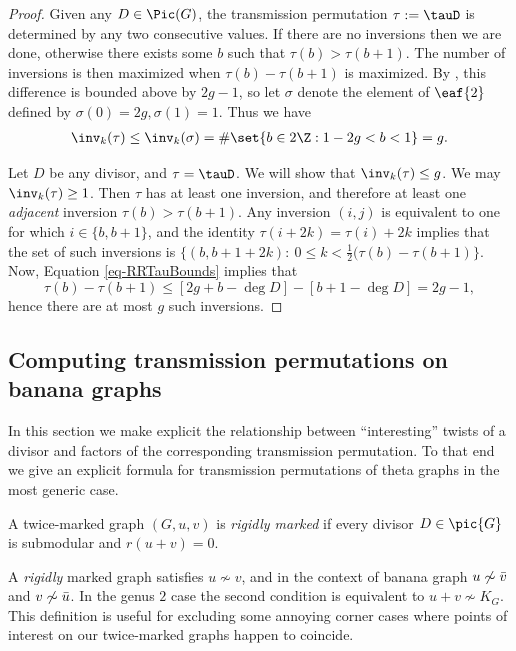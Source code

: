 \begin{proof}
    Given any $D \in \Pic(G)$, the transmission permutation $\tau:= \tauD$ is determined by any two consecutive values. If there are no inversions then we are done, otherwise there exists some $b$ such that $\tau(b)>\tau(b+1)$. The number of inversions is then maximized when $\tau(b)-\tau(b+1)$ is maximized. By , this difference is bounded above by $2g-1$, so let $\sigma$ denote the element of $\eaf{2}$ defined by $\sigma(0) = 2g,\sigma(1) = 1$. Thus we have
    \begin{align*}
        \inv_k(\tau) \leq \inv_k(\sigma) = \#\set{b \in 2\Z: 1-2g<b<1} =g.
    \end{align*}

    Let $D$ be any divisor, and $\tau = \tauD$. We will show that $\inv_k(\tau) \leq g$. We may $\inv_k(\tau) \geq 1$. Then $\tau$ has at least one inversion, and therefore at least one \emph{adjacent} inversion $\tau(b) > \tau(b+1)$. Any inversion $(i,j)$ is equivalent to one for which $i \in \{b,b+1\}$, and the identity $\tau(i+2k) = \tau(i)+2k$ implies that the set of such inversions is $\{(b,b+1+2k):\ 0 \leq k < \frac12(\tau(b) - \tau(b+1) \}$. Now, Equation \eqref{eq-RRTauBounds} implies that 
    \[ \tau(b) - \tau(b+1) \leq \left[ 2g+b - \deg D \right] - \left[ b+1 - \deg D \right] = 2g-1,\]
    hence there are at most $g$ such inversions.
\end{proof}

\subsection{Computing transmission permutations on banana graphs}
In this section we make explicit the relationship between ``interesting'' twists of a divisor and factors of the corresponding transmission permutation. To that end we give an explicit formula for transmission permutations of theta graphs in the most generic case.

\begin{defi}
    A twice-marked graph $(G,u,v)$ is \textit{rigidly marked} if every divisor $D \in \pic{G}$ is submodular and $r(u + v) = 0$.
\end{defi}

A \textit{rigidly} marked graph satisfies $u \not \sim v$, and in the context of banana graph $u \not \sim \Bar{v}$ and $v \not \sim \Bar{u}$. In the genus $2$ case the second condition is equivalent to $u+v \not \sim K_G$. This definition is useful for excluding some annoying corner cases where points of interest on our twice-marked graphs happen to coincide.

